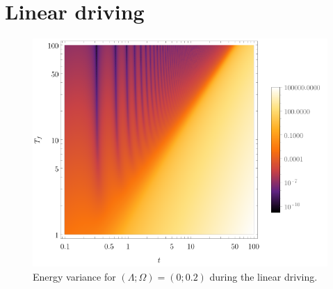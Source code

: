 \section{Linear driving}

\begin{figure}[H]
    \centering
    \includegraphics[scale=1.2]{../img/densVariance.pdf}
    \caption{Energy variance for $(\Lambda;\Omega)=(0;0.2)$ during the linear driving.}
    \label{fig:dens3}
\end{figure}